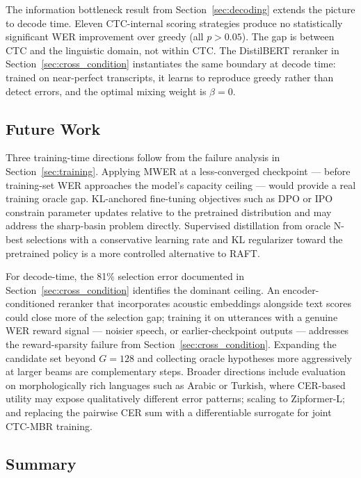 The information bottleneck result from Section~\ref{sec:decoding} extends the picture to decode time. Eleven CTC-internal scoring strategies produce no statistically significant WER improvement over greedy (all $p > 0.05$). The gap is between CTC and the linguistic domain, not within CTC. The DistilBERT reranker in Section~\ref{sec:cross_condition} instantiates the same boundary at decode time: trained on near-perfect transcripts, it learns to reproduce greedy rather than detect errors, and the optimal mixing weight is $\beta=0$.



\subsection{Future Work}

Three training-time directions follow from the failure analysis in Section~\ref{sec:training}. Applying MWER at a less-converged checkpoint — before training-set WER approaches the model's capacity ceiling — would provide a real training oracle gap. KL-anchored fine-tuning objectives such as DPO or IPO constrain parameter updates relative to the pretrained distribution and may address the sharp-basin problem directly. Supervised distillation from oracle N-best selections with a conservative learning rate and KL regularizer toward the pretrained policy is a more controlled alternative to RAFT.

For decode-time, the 81\% selection error documented in Section~\ref{sec:cross_condition} identifies the dominant ceiling. An encoder-conditioned reranker that incorporates acoustic embeddings alongside text scores could close more of the selection gap; training it on utterances with a genuine WER reward signal — noisier speech, or earlier-checkpoint outputs — addresses the reward-sparsity failure from Section~\ref{sec:cross_condition}. Expanding the candidate set beyond $G=128$ and collecting oracle hypotheses more aggressively at larger beams are complementary steps. Broader directions include evaluation on morphologically rich languages such as Arabic or Turkish, where CER-based utility may expose qualitatively different error patterns; scaling to Zipformer-L; and replacing the pairwise CER sum with a differentiable surrogate for joint CTC-MBR training.



\subsection{Summary}

